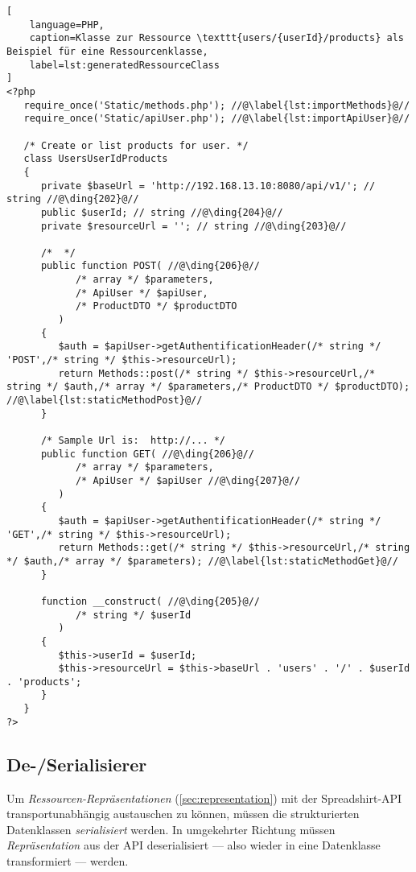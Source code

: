 \begin{minipage}{\textwidth}
\begin{lstlisting}[
    language=PHP,
    caption=Klasse zur Ressource \texttt{users/{userId}/products} als Beispiel für eine Ressourcenklasse,
    label=lst:generatedRessourceClass
]
<?php
   require_once('Static/methods.php'); //@\label{lst:importMethods}@//
   require_once('Static/apiUser.php'); //@\label{lst:importApiUser}@//

   /* Create or list products for user. */
   class UsersUserIdProducts
   {
      private $baseUrl = 'http://192.168.13.10:8080/api/v1/'; // string //@\ding{202}@//
      public $userId; // string //@\ding{204}@//
      private $resourceUrl = ''; // string //@\ding{203}@//

      /*  */
      public function POST( //@\ding{206}@//
            /* array */ $parameters,
            /* ApiUser */ $apiUser,
            /* ProductDTO */ $productDTO
         )
      {
         $auth = $apiUser->getAuthentificationHeader(/* string */ 'POST',/* string */ $this->resourceUrl);
         return Methods::post(/* string */ $this->resourceUrl,/* string */ $auth,/* array */ $parameters,/* ProductDTO */ $productDTO); //@\label{lst:staticMethodPost}@//
      }

      /* Sample Url is:  http://... */
      public function GET( //@\ding{206}@//
            /* array */ $parameters,
            /* ApiUser */ $apiUser //@\ding{207}@//
         )
      {
         $auth = $apiUser->getAuthentificationHeader(/* string */ 'GET',/* string */ $this->resourceUrl);
         return Methods::get(/* string */ $this->resourceUrl,/* string */ $auth,/* array */ $parameters); //@\label{lst:staticMethodGet}@//
      }

      function __construct( //@\ding{205}@//
            /* string */ $userId
         )
      {
         $this->userId = $userId;
         $this->resourceUrl = $this->baseUrl . 'users' . '/' . $userId . 'products';
      }
   }
?>
\end{lstlisting}
\end{minipage}

\subsection{De-/Serialisierer}
\label{sec:serialiser}

Um \emph{Ressourcen-Repräsentationen} (\cref{sec:representation}) mit der Spreadshirt-\gls{API} transportunabhängig austauschen zu können, müssen die strukturierten Datenklassen \emph{serialisiert} werden. In umgekehrter Richtung müssen \emph{Repräsentation} aus der \gls{API} deserialisiert --- also wieder in eine Datenklasse transformiert --- werden.

